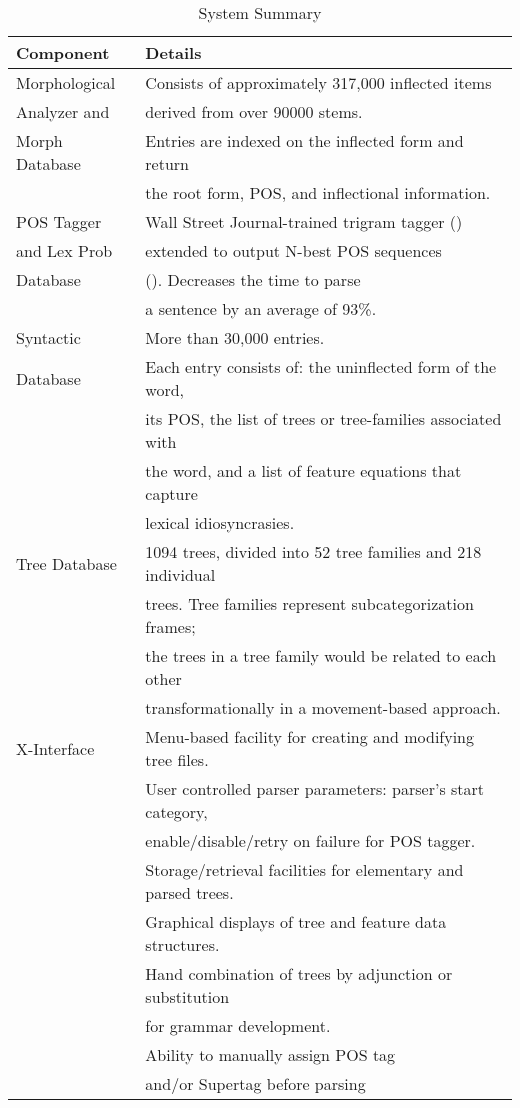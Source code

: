 \begin{table}[ht]
\small
\centering
\begin{tabular}{|l|l|} \hline
Component & Details \\ \hline
Morphological & Consists of approximately 317,000 inflected items \\ 
Analyzer and & derived from over 90000 stems. \\ 
Morph Database & Entries are indexed on the inflected form and return \\
& the root form, POS, and inflectional information.\\ \hline
POS Tagger & Wall Street Journal-trained
trigram tagger (\cite{kwc88})  \\ 
and  Lex Prob & extended to output N-best POS sequences  \\
Database & (\cite{soong90}). Decreases the time to parse \\
&a sentence by an average of 93\%. \\\hline
Syntactic &  More than 30,000 entries. \\
Database & Each entry consists of: the uninflected form of the word, \\
& its POS, the list of trees or tree-families associated with \\
& the word, and a list of feature equations that capture \\
&lexical idiosyncrasies. \\ \hline
Tree Database &  1094 trees, divided into 52 tree families and 218 individual \\
& trees. Tree families represent subcategorization frames; \\
& the trees in a tree family would be related to each other \\

& transformationally in a movement-based approach. \\ \hline
X-Interface & Menu-based facility for creating and modifying tree files. \\
&  User controlled parser parameters: parser's start category, \\ 
& enable/disable/retry on failure for POS tagger. \\
& Storage/retrieval facilities for elementary and parsed trees.\\
& Graphical displays of tree and feature data structures. \\
& Hand combination of trees by adjunction or substitution \\
& for grammar development. \\ 
& Ability to manually assign POS tag \\
& and/or Supertag before parsing \\ \hline
\end{tabular}
\caption{System Summary}
\label{sys-table}
\end{table}

